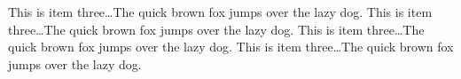 \documentclass[11pt]{article}%
\begin{document}
\begin{multicols*}{2}
This is item three\dots The quick brown fox jumps
over the lazy dog. This is item three\dots The quick brown fox jumps over the lazy dog. This is item three\dots The quick brown fox jumps over the lazy dog. This is item three\dots The quick brown fox jumps over the lazy dog.


\printindex %

\end{multicols*}
\end{document}
